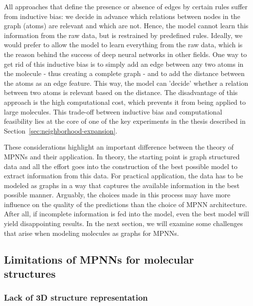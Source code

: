 All approaches that define the presence or absence of edges by certain rules suffer from inductive bias: we decide in advance which relations between nodes in the graph (atoms) are relevant and which are not. Hence, the model cannot learn this information from the raw data, but is restrained by predefined rules. Ideally, we would prefer to allow the model to learn everything from the raw data, which is the reason behind the success of deep neural networks in other fields. One way to get rid of this inductive bias is to simply add an edge between any two atoms in the molecule - thus creating a complete graph - and to add the distance between the atoms as an edge feature. This way, the model can 'decide' whether a relation between two atoms is relevant based on the distance. The disadvantage of this approach is the high computational cost, which prevents it from being applied to large molecules. This trade-off between inductive bias and computational feasibility lies at the core of one of the key experiments in the thesis described in Section~\ref{sec:neighborhood-expansion}.

%

These considerations highlight an important difference between the theory of MPNNs and their application. In theory, the starting point is graph structured data and all the effort goes into the construction of the best possible model to extract information from this data. For practical application, the data has to be modeled as graphs in a way that captures the available information in the best possible manner. Arguably, the choices made in this process may have more influence on the quality of the predictions than the choice of MPNN architecture. After all, if incomplete information is fed into the model, even the best model will yield disappointing results. In the next section, we will examine some challenges that arise when modeling molecules as graphs for MPNNs.


\subsection{Limitations of MPNNs for molecular structures}
\label{sec:limitations}

\subsubsection{Lack of 3D structure representation}
\label{sec:lack-of-3d-structure}

